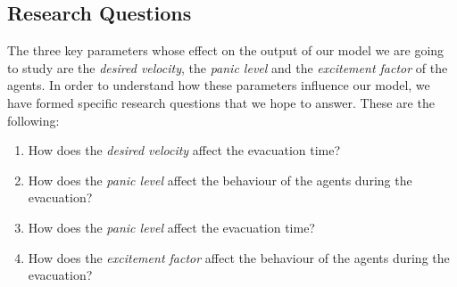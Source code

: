 \subsection{Research Questions}
The three key parameters whose effect on the output of our model we are going to study are the \emph{desired velocity}, the \emph{panic level} and the \emph{excitement factor} of the agents. In order to understand how these parameters influence our model, we have formed specific research questions that we hope to answer. These are the following:
\begin{enumerate}
	\item How does the \emph{desired velocity} affect the evacuation time?
	
	\item How does the \emph{panic level} affect the behaviour of the agents during the evacuation?
	
	\item How does the \emph{panic level} affect the evacuation time?
	
	\item How does the \emph{excitement factor} affect the behaviour of the agents during the evacuation?
\end{enumerate}
